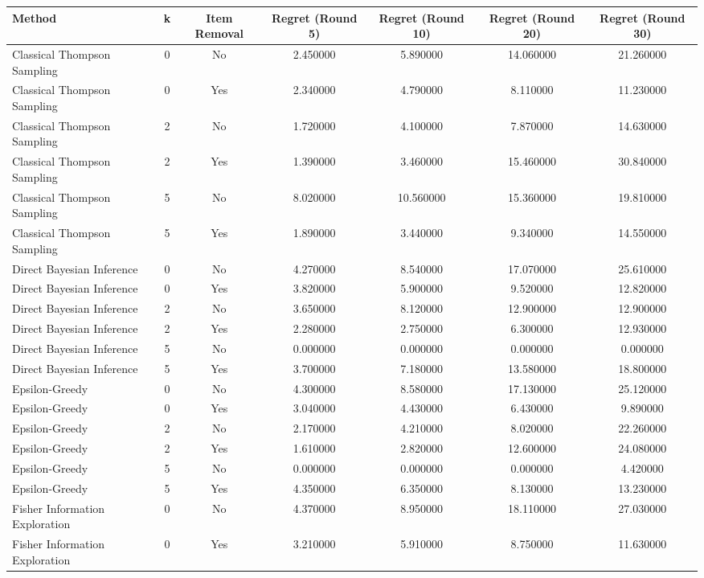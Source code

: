 \begin{tabular}{|l|c|c|c|c|c|c|}
\toprule
Method & k & Item Removal & Regret (Round 5) & Regret (Round 10) & Regret (Round 20) & Regret (Round 30) \\
\midrule
Classical Thompson Sampling & 0 & No & 2.450000 & 5.890000 & 14.060000 & 21.260000 \\
Classical Thompson Sampling & 0 & Yes & 2.340000 & 4.790000 & 8.110000 & 11.230000 \\
Classical Thompson Sampling & 2 & No & 1.720000 & 4.100000 & 7.870000 & 14.630000 \\
Classical Thompson Sampling & 2 & Yes & 1.390000 & 3.460000 & 15.460000 & 30.840000 \\
Classical Thompson Sampling & 5 & No & 8.020000 & 10.560000 & 15.360000 & 19.810000 \\
Classical Thompson Sampling & 5 & Yes & 1.890000 & 3.440000 & 9.340000 & 14.550000 \\
Direct Bayesian Inference & 0 & No & 4.270000 & 8.540000 & 17.070000 & 25.610000 \\
Direct Bayesian Inference & 0 & Yes & 3.820000 & 5.900000 & 9.520000 & 12.820000 \\
Direct Bayesian Inference & 2 & No & 3.650000 & 8.120000 & 12.900000 & 12.900000 \\
Direct Bayesian Inference & 2 & Yes & 2.280000 & 2.750000 & 6.300000 & 12.930000 \\
Direct Bayesian Inference & 5 & No & 0.000000 & 0.000000 & 0.000000 & 0.000000 \\
Direct Bayesian Inference & 5 & Yes & 3.700000 & 7.180000 & 13.580000 & 18.800000 \\
Epsilon-Greedy & 0 & No & 4.300000 & 8.580000 & 17.130000 & 25.120000 \\
Epsilon-Greedy & 0 & Yes & 3.040000 & 4.430000 & 6.430000 & 9.890000 \\
Epsilon-Greedy & 2 & No & 2.170000 & 4.210000 & 8.020000 & 22.260000 \\
Epsilon-Greedy & 2 & Yes & 1.610000 & 2.820000 & 12.600000 & 24.080000 \\
Epsilon-Greedy & 5 & No & 0.000000 & 0.000000 & 0.000000 & 4.420000 \\
Epsilon-Greedy & 5 & Yes & 4.350000 & 6.350000 & 8.130000 & 13.230000 \\
Fisher Information Exploration & 0 & No & 4.370000 & 8.950000 & 18.110000 & 27.030000 \\
Fisher Information Exploration & 0 & Yes & 3.210000 & 5.910000 & 8.750000 & 11.630000 \\

\end{tabular}
